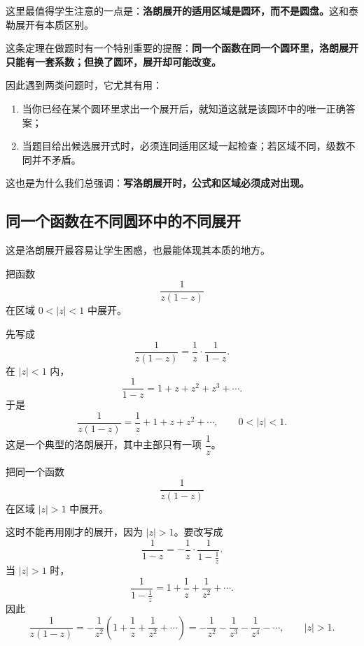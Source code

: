 \begin{zhu}{}{}
这里最值得学生注意的一点是：\textbf{洛朗展开的适用区域是圆环，而不是圆盘。}这和泰勒展开有本质区别。
\end{zhu}

\begin{tishi}[洛朗展开唯一性怎么使用]
这条定理在做题时有一个特别重要的提醒：\textbf{同一个函数在同一个圆环里，洛朗展开只能有一套系数；但换了圆环，展开却可能改变。}

因此遇到两类问题时，它尤其有用：
\begin{enumerate}
    \item 当你已经在某个圆环里求出一个展开后，就知道这就是该圆环中的唯一正确答案；
    \item 当题目给出候选展开式时，必须连同适用区域一起检查；若区域不同，级数不同并不矛盾。
\end{enumerate}
这也是为什么我们总强调：\textbf{写洛朗展开时，公式和区域必须成对出现。}
\end{tishi}

\subsection{同一个函数在不同圆环中的不同展开}

这是洛朗展开最容易让学生困惑，也最能体现其本质的地方。

\begin{lizi}{}{}
把函数
\[
    \frac{1}{z(1-z)}
\]
在区域 $0<|z|<1$ 中展开。

\begin{jie}
先写成
\[
    \frac{1}{z(1-z)}=\frac{1}{z}\cdot\frac{1}{1-z}.
\]
在 $|z|<1$ 内，
\[
    \frac{1}{1-z}=1+z+z^2+z^3+\cdots.
\]
于是
\[
    \frac{1}{z(1-z)}
    = \frac{1}{z}+1+z+z^2+\cdots,
\qquad 0<|z|<1.
\]
这是一个典型的洛朗展开，其中主部只有一项 $\dfrac{1}{z}$。
\end{jie}
\end{lizi}

\begin{lizi}{}{}
把同一个函数
\[
    \frac{1}{z(1-z)}
\]
在区域 $|z|>1$ 中展开。

\begin{jie}
这时不能再用刚才的展开，因为 $|z|>1$。要改写成
\[
    \frac{1}{1-z} = -\frac{1}{z}\cdot\frac{1}{1-\frac{1}{z}}.
\]
当 $|z|>1$ 时，
\[
    \frac{1}{1-\frac{1}{z}}
    = 1+\frac{1}{z}+\frac{1}{z^2}+\cdots.
\]
因此
\[
    \frac{1}{z(1-z)}
    = -\frac{1}{z^2}\left(1+\frac{1}{z}+\frac{1}{z^2}+\cdots\right)
    = -\frac{1}{z^2}-\frac{1}{z^3}-\frac{1}{z^4}-\cdots,
\qquad |z|>1.
\]
\end{jie}
\end{lizi}

